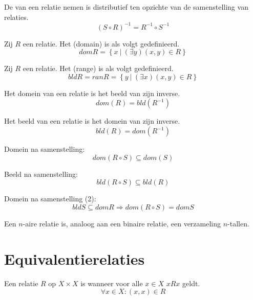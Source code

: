\documentclass[main.tex]{subfiles}
\begin{document}
\begin{st}
  De  van een relatie nemen is distributief ten opzichte van de samenstelling van relaties.
  \[ (S \circ R)^{-1} = R^{-1} \circ S^{-1} \]
\end{st}

\begin{de}
  Zij $R$ een relatie. Het  (domain) is als volgt gedefinieerd.
  \[ dom R = \left\{ x \ |\ (\exists y)(x,y) \in R \right\} \]
\end{de}

\begin{de}
  Zij $R$ een relatie. Het  (range) is als volgt gedefinieerd.
  \[ bld  R = ran R = \left\{ y \ |\ (\exists x)(x,y) \in R \right\} \]
\end{de}

\begin{st}
  Het domein van een relatie is het beeld van zijn inverse.
  \[ dom(R) = bld(R^{-1}) \]
\end{st}

\begin{st}
  Het beeld van een relatie is het domein van zijn inverse.
  \[ bld(R) = dom(R^{-1}) \]
\end{st}

\begin{st}
  Domein na samenstelling:
  \[ dom (R \circ S) \subseteq dom(S) \]
\end{st}
 
\begin{st}
  Beeld na samenstelling:
  \[ bld (R \circ S) \subseteq bld(R) \]
\end{st}

\begin{st}
  Domein na samenstelling (2):
  \[ bld S \subseteq dom R \Rightarrow dom(R \circ S) = dom S \]
\end{st}

\begin{de}
  Een $n$-aire relatie is, analoog aan een binaire relatie, een verzameling $n$-tallen.
\end{de}

\section{Equivalentierelaties}
\label{sec:equivalentierelaties}

\begin{de}
  \label{de:reflexief}
  Een relatie $R$ op $X \times X$ is  wanneer voor alle $x\in X$ $xRx$ geldt.
  \[ \forall x \in X: (x,x) \in R \]
\end{de}
\end{document}
